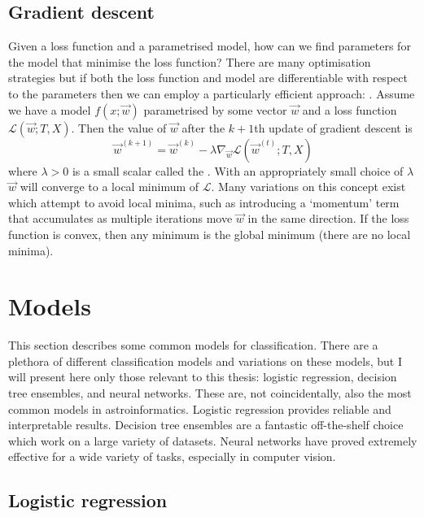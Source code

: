     \subsection{Gradient descent}
    \label{sec:gradient-descent}

        Given a loss function and a parametrised model, how can we find parameters for the model that minimise the loss function? There are many optimisation strategies but if both the loss function and model are differentiable with respect to the parameters then we can employ a particularly efficient approach: . Assume we have a model $f(x; \vec w)$ parametrised by some vector $\vec w$ and a loss function $\mathcal L(\vec w; T, X)$. Then the value of $\vec w$ after the $k + 1$th update of gradient descent is
        \begin{equation}
            \label{sec:gradient-descent}
            \vec w^{(k + 1)} = \vec w^{(k)} - \lambda \nabla_{\vec w} \mathcal L(\vec w^{(t)}; T, X)
        \end{equation}
        where $\lambda > 0$ is a small scalar called the . With an appropriately small choice of $\lambda$ $\vec w$ will converge to a local minimum of $\mathcal L$. Many variations on this concept exist which attempt to avoid local minima, such as introducing a `momentum' term that accumulates as multiple iterations move $\vec w$ in the same direction. If the loss function is convex, then any minimum is the global minimum (there are no local minima).

\section{Models}
\label{sec:models}

    This section describes some common models for classification. There are a plethora of different classification models and variations on these models, but I will present here only those relevant to this thesis: logistic regression, decision tree ensembles, and neural networks. These are, not coincidentally, also the most common models in astroinformatics. Logistic regression provides reliable and interpretable results. Decision tree ensembles are a fantastic off-the-shelf choice which work on a large variety of datasets. Neural networks have proved extremely effective for a wide variety of tasks, especially in computer vision.

    \subsection{Logistic regression}
    \label{sec:logistic-regression}

